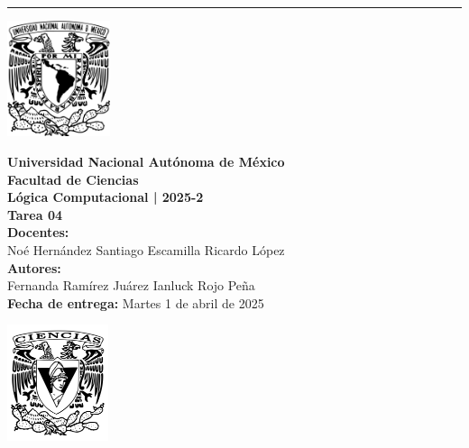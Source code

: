 \documentclass[12pt,letterpaper]{article}
\begin{document}
\hrule height 0.1pt
\bigskip

\begin{center}
  \begin{minipage}{3cm}
    \begin{center}
      \includegraphics[height=3.4cm]{../unam_logo.png}
    \end{center}
  \end{minipage}\hfill
  \begin{minipage}{10cm}
    \begin{center}
      \textbf{\Large Universidad Nacional Autónoma de México}\\[0.2cm]
      \textbf{\large Facultad de Ciencias}\\[0.2cm]
      \textbf{Lógica Computacional | 2025-2}\\[0.4cm]
      \textbf{\Large Tarea 04}\\[0.1cm]
      \textbf{Docentes:}\\
      Noé Hernández \hspace{0.9em} Santiago Escamilla \hspace{0.9em} Ricardo López\\[0.3cm]
      \textbf{Autores:}\\
      Fernanda Ramírez Juárez \quad Ianluck Rojo Peña\\[0.3cm]
      \textbf{Fecha de entrega:} Martes 1 de abril de 2025
    \end{center}
  \end{minipage}\hfill
  \begin{minipage}{3cm}
    \begin{center}
      \includegraphics[height=3.4cm]{../fc_logo.png}
    \end{center}
  \end{minipage}
\end{center}
\end{document}
